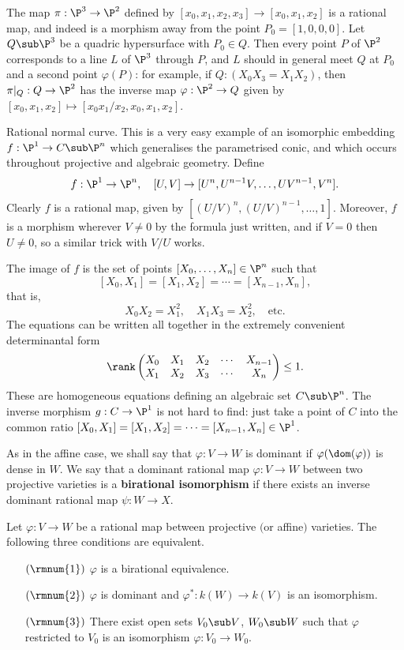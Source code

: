 \begin{example}
The map $\pi:\P^3\to\P^2$ defined by $[x_0,x_1,x_2,x_3]\to[x_0,x_1,x_2]$ is a rational map, and indeed is a morphism away from the point $P_0=[1,0,0,0]$. Let $Q\sub\P^3$ be a quadric hypersurface with $P_0\in Q$. Then every point $P$ of $\P^2$ corresponds to a line $L$ of $\P^3$ through $P$, and $L$ should in general meet $Q$ at $P_0$ and a second point $\varphi(P)$: for example, if $Q:(X_0X_3=X_1X_2)$, then $\pi|_Q:Q\to\P^2$ has the inverse map $\varphi:\P^2\to Q$ given by $[x_0,x_1,x_2]\mapsto[x_0x_1/x_2,x_0,x_1,x_2]$.
\end{example}
\begin{example}
Rational normal curve. This is a very easy example of an isomorphic embedding $f:\P^1\to C\sub\P^n$ which generalises the parametrised conic, and which occurs throughout projective and algebraic geometry. Define
\[f:\P^1\to\P^n,\quad [U,V]\to [U^n,U^{n-1}V,\dots,UV^{n-1},V^n].\]
Clearly $f$ is a rational map, given by $[(U/V)^n,(U/V)^{n-1},\dots,1]$. Moreover, $f$ is a morphism wherever $V\neq0$ by the formula just written, and if $V=0$ then $U\neq 0$, so a similar trick with $V/U$ works.\par
The image of $f$ is the set of points $[X_0,\dots,X_n]\in\P^n$ such that
\[[X_0,X_1]=[X_1,X_2]=\cdots=[X_{n-1},X_n],\]
that is,
\[X_0X_2=X_1^2,\quad X_1X_3=X_2^2,\quad\text{etc}.\]
The equations can be written all together in the extremely convenient determinantal form
\[\rank\begin{pmatrix}
X_0&X_1&X_2&\cdots&X_{n-1}\\
X_1&X_2&X_3&\cdots&X_{n}
\end{pmatrix}\leq 1.\]
These are homogeneous equations defining an algebraic set $C\sub\P^n$. The inverse morphism $g:C\to\P^1$ is not hard to find: just take a point of $C$ into the common ratio $[X_0,X_1]=[X_1,X_2]=\cdots=[X_{n-1},X_{n}]\in\P^1$.
\end{example}
As in the affine case, we shall say that $\varphi:V\to W$ is dominant if $\varphi(\dom(\varphi))$ is dense in $W$. We say that a dominant rational map $\varphi:V\to W$ between two projective varieties is a \textbf{birational isomorphism} if there exists an inverse dominant rational map $\psi:W\to X$.
\begin{proposition}\label{biration equiv iff}
Let $\varphi:V\to W$ be a rational map between projective $($or affine$)$ varieties. The following three conditions are equivalent.
\begin{itemize}
\item[$(\rmnum{1})$] $\varphi$ is a birational equivalence.
\item[$(\rmnum{2})$] $\varphi$ is dominant and $\varphi^*:k(W)\to k(V)$ is an isomorphism.
\item[$(\rmnum{3})$] There exist open sets $V_0\sub V$, $W_0\sub W$ such that $\varphi$ restricted to $V_0$ is an isomorphism $\varphi:V_0\to W_0$.
\end{itemize}
\end{proposition}
